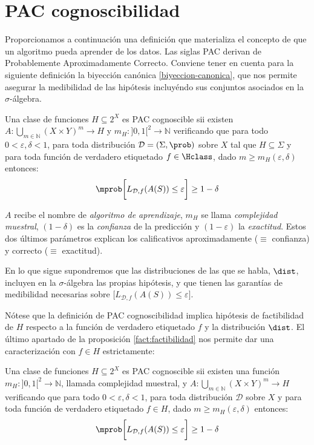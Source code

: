 \section{PAC cognoscibilidad}
Proporcionamos a continuación una definición que materializa el concepto de que un algoritmo pueda aprender de los datos. Las
siglas PAC derivan de Probablemente Aproximadamente Correcto. Conviene tener en cuenta para la siguiente definición la
biyección canónica \ref{biyeccion-canonica}, que nos permite asegurar la medibilidad de las hipótesis incluyéndo sus conjuntos
asociados en la $\sigma$-álgebra.

\begin{definition}
Una clase de funciones $H \subseteq 2^X$ es PAC cognoscible sii existen $A: \underset{m\in \mathbb{N}}{\bigcup} (X\times Y)^m \rightarrow H$ 
y $m_{H} : ]0,1[^2\rightarrow \mathbb{N}$ verificando que para todo
$0 < \varepsilon, \delta < 1$, para toda distribución $\mathcal{D}=(\Sigma, \prob)$ sobre $X$ tal que $H\subseteq \Sigma$
y para toda función de verdadero etiquetado $f\in \Hclass$, dado $m \ge m_H(\varepsilon, \delta)$ entonces:
\[
  \mprob \bigg[L_{\mathcal{D},f}(A(S)) \le \varepsilon \bigg] \ge 1-\delta
\]
\label{def:pac-original}
\end{definition}

$A$ recibe el nombre de \textit{algoritmo de aprendizaje}, $m_H$ se llama \textit{complejidad muestral}, $(1-\delta)$ es la 
\textit{confianza} de la predicción y $(1-\varepsilon)$ la \textit{exactitud}. Estos dos últimos parámetros explican los 
calificativos aproximadamente ($\equiv$ confianza) y correcto ($\equiv$ exactitud).

En lo que sigue supondremos que las distribuciones de las que se habla, $\dist$, incluyen en la $\sigma$-álgebra las propias
hipótesis, y que tienen las garantías de medibilidad necesarias sobre $\bigg[L_{\mathcal{D},f}(A(S)) \le \varepsilon \bigg]$.

Nótese que la definición de PAC cognoscibilidad implica hipótesis de factibilidad de $H$ respecto a la función de verdadero
etiquetado $f$ y la distribución $\dist$. El último apartado de la proposición \ref{fact:factibilidad} 
nos permite dar una caracterización con $f\in H$ estrictamente:

\begin{charact}
Una clase de funciones $H \subseteq 2^X$ es PAC cognoscible sii existen una función 
$m_{H} : ]0,1[^2\rightarrow \mathbb{N}$, llamada complejidad muestral, y 
$A: \underset{m\in \mathbb{N}}{\bigcup} (X\times Y)^m \rightarrow H$ verificando que para todo
$0 < \varepsilon, \delta < 1$, para toda distribución $\mathcal{D}$ sobre $X$ y para toda función de 
verdadero etiquetado $f\in H$, dado $m \ge m_H(\varepsilon, \delta)$ entonces:
\[
  \mprob \bigg[L_{\mathcal{D},f}(A(S)) \le \varepsilon \bigg] \ge 1-\delta
\]
\label{def:pac}
\end{charact}

